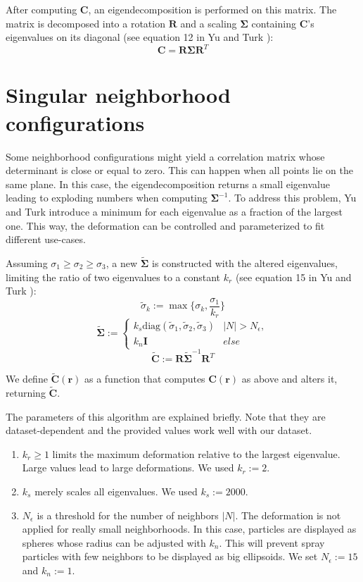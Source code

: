 After computing $\textbf{C}$, an eigendecomposition is performed on this matrix. The matrix is decomposed into a rotation $\textbf{R}$ and a scaling $\bm{\Sigma}$ containing $\textbf{C}$'s eigenvalues on its diagonal (see equation 12 in Yu and Turk \cite{Yu:2013}):
\[ \textbf{C} = \textbf{R} \bm{\Sigma} \textbf{R}^T \]

\section{Singular neighborhood configurations}

Some neighborhood configurations might yield a correlation matrix whose determinant is close or equal to zero. This can happen when all points lie on the same plane. In this case, the eigendecomposition returns a small eigenvalue leading to exploding numbers when computing $\bm{\Sigma}^{-1}$. To address this problem, Yu and Turk introduce a minimum for each eigenvalue as a fraction of the largest one. This way, the deformation can be controlled and parameterized to fit different use-cases.

Assuming $\sigma_1 \geq \sigma_2 \geq \sigma_3$, a new $\tilde{\bm{\Sigma}}$ is constructed with the altered eigenvalues, limiting the ratio of two eigenvalues to a constant $k_r$ (see equation 15 in Yu and Turk \cite{Yu:2013}):
\[ \tilde{\sigma}_k := \max \{ \sigma_k, \frac{\sigma_1}{k_r} \} \]
\[
\tilde{\bm{\Sigma}} :=
\begin{cases}
k_s \text{diag}(\tilde{\sigma}_1, \tilde{\sigma}_2, \tilde{\sigma}_3) & |N| > N_{\epsilon}, \\
k_n \textbf{I} & else
\end{cases}
\]
\[ \tilde{\textbf{C}} := \textbf{R} \tilde{\bm{\Sigma}}^{-1} \textbf{R}^T \]

We define $\tilde{\textbf{C}}(\textbf{r})$ as a function that computes $\textbf{C}(\textbf{r})$ as above and alters it, returning $\tilde{\textbf{C}}$.

The parameters of this algorithm are explained briefly. Note that they are dataset-dependent and the provided values work well with our dataset.
\begin{enumerate}
    \item $k_r \geq 1$ limits the maximum deformation relative to the largest eigenvalue. Large values lead to large deformations. We used $k_r := 2$.
    \item $k_s$ merely scales all eigenvalues. We used $k_s:= 2000$.
    \item $N_{\epsilon}$ is a threshold for the number of neighbors $|N|$. The deformation is not applied for really small neighborhoods. In this case, particles are displayed as spheres whose radius can be adjusted with $k_n$. This will prevent spray particles with few neighbors to be displayed as big ellipsoids. We set $N_{\epsilon} := 15$ and $k_n := 1$.
\end{enumerate}

